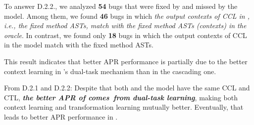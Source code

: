 To answer D.2.2., we analyzed {\bf 54} bugs that were fixed by
{\tool} and missed by the  model. Among them, we found
{\bf 46} bugs in which {\em the output contexts of CCL in {\tool},
  i.e., the fixed method ASTs, match with the fixed method ASTs
  (contexts) in the oracle}. In contrast, we found only {\bf 18} bugs
in which the output contexts of CCL in the  model
match with the fixed method ASTs.

This result indicates that better APR performance is partially due to
the better context learning in {\tool}'s dual-task mechanism than in
the cascading one.


From D.2.1 and D.2.2: Despite that both {\tool} and the
 model have the same CCL and CTL, {\bf {\em the better
    APR of {\tool} comes~from dual-task learning}},
 making both context learning and transformation learning mutually
 better. Eventually, that leads to better APR performance in {\tool}.









